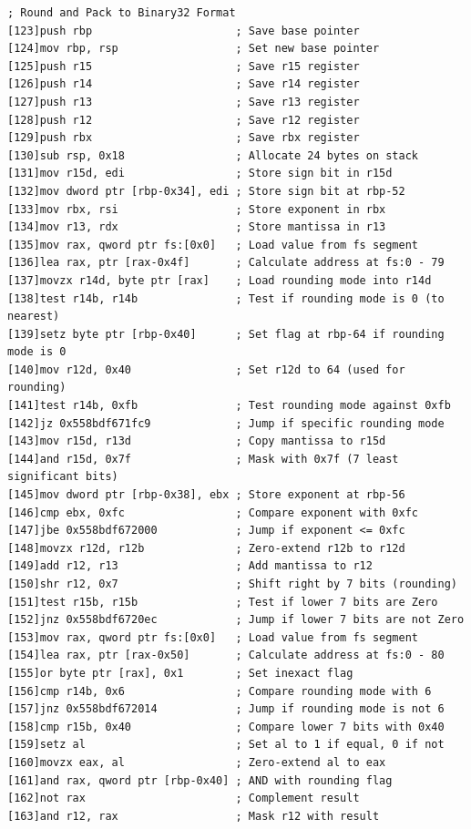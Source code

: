 \documentclass[12pt,letter]{article}
\begin{document}
\begin{lstlisting}[style=rust, caption={Annotated IEE-754 Binary32 Normal Subtraction ASM Trace}, label={fig:ieee_subtract}]
; Round and Pack to Binary32 Format
[123]push rbp                      ; Save base pointer
[124]mov rbp, rsp                  ; Set new base pointer
[125]push r15                      ; Save r15 register
[126]push r14                      ; Save r14 register
[127]push r13                      ; Save r13 register
[128]push r12                      ; Save r12 register
[129]push rbx                      ; Save rbx register
[130]sub rsp, 0x18                 ; Allocate 24 bytes on stack
[131]mov r15d, edi                 ; Store sign bit in r15d
[132]mov dword ptr [rbp-0x34], edi ; Store sign bit at rbp-52
[133]mov rbx, rsi                  ; Store exponent in rbx
[134]mov r13, rdx                  ; Store mantissa in r13
[135]mov rax, qword ptr fs:[0x0]   ; Load value from fs segment
[136]lea rax, ptr [rax-0x4f]       ; Calculate address at fs:0 - 79
[137]movzx r14d, byte ptr [rax]    ; Load rounding mode into r14d
[138]test r14b, r14b               ; Test if rounding mode is 0 (to nearest)
[139]setz byte ptr [rbp-0x40]      ; Set flag at rbp-64 if rounding mode is 0
[140]mov r12d, 0x40                ; Set r12d to 64 (used for rounding)
[141]test r14b, 0xfb               ; Test rounding mode against 0xfb
[142]jz 0x558bdf671fc9             ; Jump if specific rounding mode
[143]mov r15d, r13d                ; Copy mantissa to r15d
[144]and r15d, 0x7f                ; Mask with 0x7f (7 least significant bits)
[145]mov dword ptr [rbp-0x38], ebx ; Store exponent at rbp-56
[146]cmp ebx, 0xfc                 ; Compare exponent with 0xfc
[147]jbe 0x558bdf672000            ; Jump if exponent <= 0xfc
[148]movzx r12d, r12b              ; Zero-extend r12b to r12d
[149]add r12, r13                  ; Add mantissa to r12
[150]shr r12, 0x7                  ; Shift right by 7 bits (rounding)
[151]test r15b, r15b               ; Test if lower 7 bits are Zero
[152]jnz 0x558bdf6720ec            ; Jump if lower 7 bits are not Zero
[153]mov rax, qword ptr fs:[0x0]   ; Load value from fs segment
[154]lea rax, ptr [rax-0x50]       ; Calculate address at fs:0 - 80
[155]or byte ptr [rax], 0x1        ; Set inexact flag
[156]cmp r14b, 0x6                 ; Compare rounding mode with 6
[157]jnz 0x558bdf672014            ; Jump if rounding mode is not 6
[158]cmp r15b, 0x40                ; Compare lower 7 bits with 0x40
[159]setz al                       ; Set al to 1 if equal, 0 if not
[160]movzx eax, al                 ; Zero-extend al to eax
[161]and rax, qword ptr [rbp-0x40] ; AND with rounding flag
[162]not rax                       ; Complement result
[163]and r12, rax                  ; Mask r12 with result

\end{lstlisting}
\end{document}
